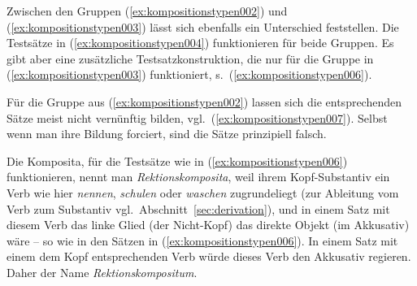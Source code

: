 \Np

\begin{exe}
  \ex\label{ex:kompositionstypen005}
  \begin{xlist}
  \end{xlist}
\end{exe}

Zwischen den Gruppen (\ref{ex:kompositionstypen002}) und (\ref{ex:kompositionstypen003}) lässt sich ebenfalls ein Unterschied feststellen.
Die Testsätze in (\ref{ex:kompositionstypen004}) funktionieren für beide Gruppen.
Es gibt aber eine zusätzliche Testsatzkonstruktion, die nur für die Gruppe in (\ref{ex:kompositionstypen003}) funktioniert, s.\ (\ref{ex:kompositionstypen006}).

\begin{exe}
  \ex\label{ex:kompositionstypen006}
  \begin{xlist}
  \end{xlist}
\end{exe}

Für die Gruppe aus (\ref{ex:kompositionstypen002}) lassen sich die entsprechenden Sätze meist nicht vernünftig bilden, vgl.\ (\ref{ex:kompositionstypen007}).
Selbst wenn man ihre Bildung forciert, sind die Sätze prinzipiell falsch.

\begin{exe}
  \ex\label{ex:kompositionstypen007}
  \begin{xlist}
  \end{xlist}
\end{exe}

Die Komposita, für die Testsätze wie in (\ref{ex:kompositionstypen006}) funktionieren, nennt man \textit{Rektionskomposita}, weil ihrem Kopf-Substantiv ein Verb wie hier \textit{nennen}, \textit{schulen} oder \textit{waschen} zugrundeliegt (zur Ableitung vom Verb zum Substantiv vgl.\ Abschnitt~\ref{sec:derivation}), und in einem Satz mit diesem Verb das linke Glied (der Nicht-Kopf) das direkte Objekt (im Akkusativ) wäre -- so wie in den Sätzen in (\ref{ex:kompositionstypen006}).
In einem Satz mit einem dem Kopf entsprechenden Verb würde dieses Verb den Akkusativ regieren.
Daher der Name \textit{Rektionskompositum}.


